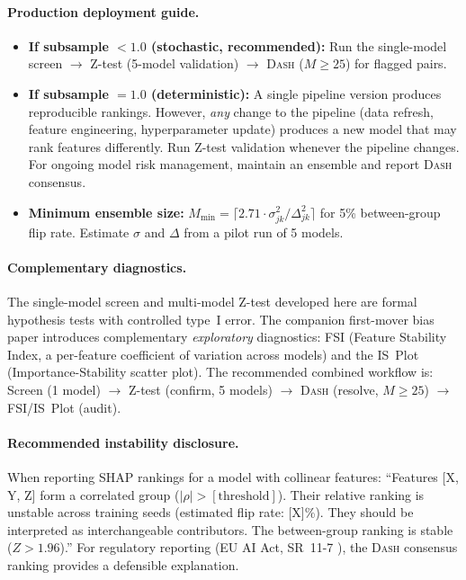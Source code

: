 \documentclass{article}
\newcommand{\DASH}{\textsc{Dash}}
\begin{document}
\paragraph{Production deployment guide.}
\begin{itemize}
    \item \textbf{If subsample $< 1.0$ (stochastic, recommended):} Run the single-model screen $\to$ Z-test (5-model validation) $\to$ \DASH{} ($M \geq 25$) for flagged pairs.
    \item \textbf{If subsample $= 1.0$ (deterministic):} A single pipeline version produces reproducible rankings. However, \emph{any} change to the pipeline (data refresh, feature engineering, hyperparameter update) produces a new model that may rank features differently. Run Z-test validation whenever the pipeline changes. For ongoing model risk management, maintain an ensemble and report \DASH{} consensus.
    \item \textbf{Minimum ensemble size:} $M_{\min} = \lceil 2.71 \cdot \sigma_{jk}^2/\Delta_{jk}^2 \rceil$ for 5\% between-group flip rate. Estimate $\sigma$ and $\Delta$ from a pilot run of 5 models.
\end{itemize}

\paragraph{Complementary diagnostics.}
The single-model screen and multi-model Z-test developed here are formal hypothesis tests with controlled type~I error. The companion first-mover bias paper introduces complementary \emph{exploratory} diagnostics: FSI (Feature Stability Index, a per-feature coefficient of variation across models) and the IS~Plot (Importance-Stability scatter plot). The recommended combined workflow is: Screen (1 model) $\to$ Z-test (confirm, 5 models) $\to$ \DASH{} (resolve, $M \geq 25$) $\to$ FSI/IS~Plot (audit).

\paragraph{Recommended instability disclosure.}
When reporting SHAP rankings for a model with collinear features: ``Features [X, Y, Z] form a correlated group ($|\rho| > [\text{threshold}]$). Their relative ranking is unstable across training seeds (estimated flip rate: [X]\%). They should be interpreted as interchangeable contributors. The between-group ranking is stable ($Z > 1.96$).'' For regulatory reporting (EU AI Act, SR~11-7 \citep{occ2011sr117}), the \DASH{} consensus ranking provides a defensible explanation.
\end{document}
